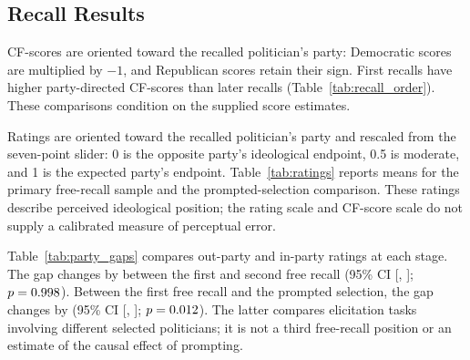 \documentclass[12pt, letterpaper]{article}
\begin{document}
\subsection{Recall Results}
\label{si_recall}
CF-scores are oriented toward the recalled politician's party: Democratic scores are multiplied by $-1$, and Republican scores retain their sign. First recalls have higher party-directed CF-scores than later recalls (Table~\ref{tab:recall_order}). These comparisons condition on the supplied score estimates.

\begin{table}[ht]
\centering
\small
\caption{CF-score Differences by Free-recall Position}
\label{tab:recall_order}

\caption*{Note: Differences are relative to the first free recall, with respondent-clustered 95\% confidence intervals. The model includes \partisanMentions{} mentions from \partisanRespondents{} Democratic or Republican respondents.}
\end{table}

Ratings are oriented toward the recalled politician's party and rescaled from the seven-point slider: 0 is the opposite party's ideological endpoint, 0.5 is moderate, and 1 is the expected party's endpoint. Table~\ref{tab:ratings} reports means for the primary free-recall sample and the prompted-selection comparison. These ratings describe perceived ideological position; the rating scale and CF-score scale do not supply a calibrated measure of perceptual error.

\begin{table}[ht]
\centering
\small
\caption{Perceived Ideological Position by Elicitation Task}
\label{tab:ratings}

\caption*{Note: Mention-weighted means with respondent-clustered 95\% confidence intervals. Free recall includes the first two names from each party. Prompted selections are matched to the actual selected name and its score. Independents are included.}
\end{table}

Table~\ref{tab:party_gaps} compares out-party and in-party ratings at each stage. The gap changes by \freeGapChange{} between the first and second free recall (95\% CI [\freeGapLower, \freeGapUpper]; $p=0.998$). Between the first free recall and the prompted selection, the gap changes by \promptedGapChange{} (95\% CI [\promptedGapLower, \promptedGapUpper]; $p=0.012$). The latter compares elicitation tasks involving different selected politicians; it is not a third free-recall position or an estimate of the causal effect of prompting.

\begin{table}[ht]
\centering
\small
\caption{Out-party Minus In-party Rating Gaps}
\label{tab:party_gaps}

\caption*{Note: Gaps and respondent-clustered 95\% confidence intervals come from the party-by-stage model with \stageMentions{} ratings from \stageRespondents{} Democratic or Republican respondents.}
\end{table}
\end{document}
